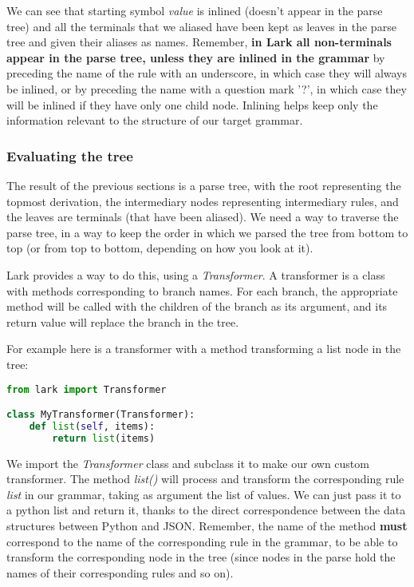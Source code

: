 \documentclass[12pt]{article}
\begin{document}
We can see that starting symbol \emph{value} is inlined (doesn't appear in the parse tree) and all the terminals that we aliased have been kept as leaves in the parse tree and given their aliases as names. Remember, \textbf{in Lark all non-terminals appear in the parse tree, unless they are inlined in the grammar} by preceding the name of the rule with an underscore, in which case they will always be inlined, or by preceding the name with a question mark '?', in which case they will be inlined if they have only one child node. Inlining helps keep only the information relevant to the structure of our target grammar.

\subsubsection{Evaluating the tree}
The result of the previous sections is a parse tree, with the root representing the topmost derivation, the intermediary nodes representing intermediary rules, and the leaves are terminals (that have been aliased). We need a way to traverse the parse tree, in a way to keep the order in which we parsed the tree from bottom to top (or from top to bottom, depending on how you look at it).

Lark provides a way to do this, using a \emph{Transformer}. A transformer is a class with methods corresponding to branch names. For each branch, the appropriate method will be called with the children of the branch as its argument, and its return value will replace the branch in the tree.

For example here is a transformer with a method transforming a list node in the tree:
\begin{lstlisting}[language=Python]
from lark import Transformer

class MyTransformer(Transformer):
    def list(self, items):
        return list(items)

\end{lstlisting}

We import the \emph{Transformer} class and subclass it to make our own custom transformer. The method \emph{list()} will process and transform the corresponding rule \emph{list} in our grammar, taking as argument the list of values. We can just pass it to a python list and return it, thanks to the direct correspondence between the data structures between Python and JSON. Remember, the name of the method \textbf{must} correspond to the name of the corresponding rule in the grammar, to be able to transform the corresponding node in the tree (since nodes in the parse hold the names of their corresponding rules and so on).
\end{document}
